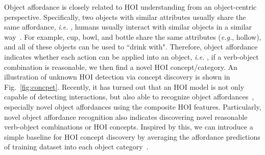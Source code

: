 \documentclass[runningheads]{llncs}
\newcommand{\ie}{\textit{i.e. }}
\newcommand{\eg}{\textit{e.g.}}
\begin{document}
Object affordance is closely related to HOI understanding from an object-centric perspective. Specifically, two objects with similar attributes usually share the same affordance, \ie, humans usually interact with similar objects in a similar way~\cite{gibson1979The}. For example, cup, bowl, and bottle share the same attributes (\eg, hollow), and all of these objects can be used to ``drink with".
Therefore, object affordance~\cite{gibson1979The,hou2021atl} indicates whether each action can be applied into an object, \ie, if a verb-object combination is reasonable, we then find a novel HOI concept/category. An illustration of unknown HOI detection via concept discovery is shown in Fig.~\ref{fig:concpet}. Recently, it has turned out that an HOI model is not only capable of detecting interactions, but also able to recognize object affordances~\cite{hou2021atl}, especially novel object affordances using the composite HOI features. Particularly, novel object affordance recognition also indicates discovering novel reasonable verb-object combinations or HOI concepts. Inspired by this, we  can introduce a simple baseline for HOI concept discovery by averaging the affordance predictions of training dataset into each object category~\cite{hou2021atl}.
\end{document}
